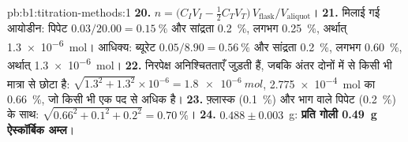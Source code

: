 \begin{solution}{pb:b1:titration-methods:1}
\textbf{20.} $n = \bigl(C_IV_I - \frac12C_TV_T\bigr)\,V_{\mathrm{flask}}/V_{\mathrm{aliquot}}$।
\textbf{21.} मिलाई गई आयोडीन: पिपेट $0.03/20.00 = \qty{0.15}{\percent}$
और सांद्रता \qty{0.2}{\percent}, लगभग \qty{0.25}{\percent}, अर्थात्
\qty{1.3e-6}{mol}। आधिक्य: ब्यूरेट $0.05/8.90 = \qty{0.56}{\percent}$ और
सांद्रता \qty{0.2}{\percent}, लगभग \qty{0.60}{\percent}, अर्थात्
\qty{1.3e-6}{mol}।
\textbf{22.} निरपेक्ष अनिश्चितताएँ जुड़ती हैं, जबकि अंतर
दोनों में से किसी भी मात्रा से छोटा है: $\sqrt{1.3^2 + 1.3^2} \times 10^{-6} =
\qty{1.8e-6}{mol}$, \qty{2.775e-4}{mol} का \qty{0.66}{\percent}, जो
किसी भी एक पद से अधिक है।
\textbf{23.} फ़्लास्क (\qty{0.1}{\percent}) और भाग वाले पिपेट
(\qty{0.2}{\percent}) के साथ: $\sqrt{0.66^2 + 0.1^2 + 0.2^2} = \qty{0.70}{\percent}$।
\textbf{24.} $0.488 \pm 0.003$~g: \textbf{प्रति गोली \qty{0.49}{g} ऐस्कॉर्बिक
अम्ल}।
\end{solution}

